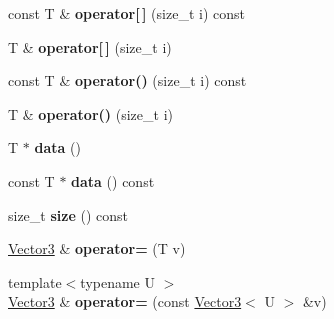 \begin{DoxyCompactItemize}
\item 
\mbox{\label{struct_p_o_p_1_1_vector3_afb15e0dc755ac3648fa2119de018599d}} 
const T \& {\bfseries operator\mbox{[}$\,$\mbox{]}} (size\+\_\+t i) const
\item 
\mbox{\label{struct_p_o_p_1_1_vector3_a1af8ff231f85743086c9d28def250a79}} 
T \& {\bfseries operator\mbox{[}$\,$\mbox{]}} (size\+\_\+t i)
\item 
\mbox{\label{struct_p_o_p_1_1_vector3_ab91216f7390b58f2cb3008cd1a3ceda1}} 
const T \& {\bfseries operator()} (size\+\_\+t i) const
\item 
\mbox{\label{struct_p_o_p_1_1_vector3_a88d21ca8fafb2c9226e084bbd047589a}} 
T \& {\bfseries operator()} (size\+\_\+t i)
\item 
\mbox{\label{struct_p_o_p_1_1_vector3_a0772e82b9f57ea326770120799ffd049}} 
T $\ast$ {\bfseries data} ()
\item 
\mbox{\label{struct_p_o_p_1_1_vector3_a5213a6c9510a3b194f3af077ed9cc826}} 
const T $\ast$ {\bfseries data} () const
\item 
\mbox{\label{struct_p_o_p_1_1_vector3_aaf3f6d6cb18a95eaa948c3a26d247b9f}} 
size\+\_\+t {\bfseries size} () const
\item 
\mbox{\label{struct_p_o_p_1_1_vector3_a9490d2f3a030bb32d7865eb07236c3ff}} 
\mbox{\hyperlink{struct_p_o_p_1_1_vector3}{Vector3}} \& {\bfseries operator=} (T v)
\item 
\mbox{\label{struct_p_o_p_1_1_vector3_acb212c80e162ac11227b35c97cca7f82}} 
{\footnotesize template$<$typename U $>$ }\\\mbox{\hyperlink{struct_p_o_p_1_1_vector3}{Vector3}} \& {\bfseries operator=} (const \mbox{\hyperlink{struct_p_o_p_1_1_vector3}{Vector3}}$<$ U $>$ \&v)
\item 
\mbox{\label{struct_p_o_p_1_1_vector3_ae73e988c25a5d10d016e1209617f5341}} 

\end{DoxyCompactItemize}
